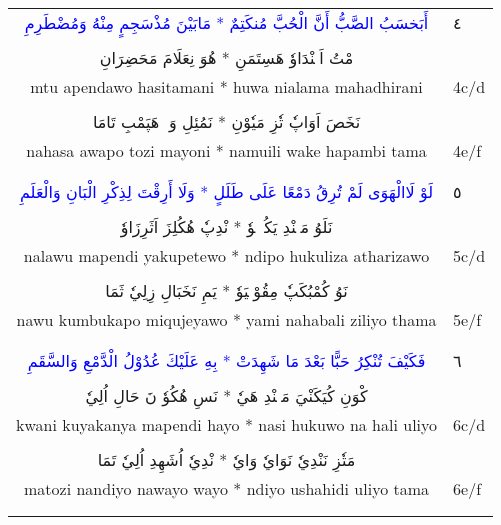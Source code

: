 \documentclass[a4paper, 10pt]{report}
\begin{document}
\begin{longtable}{cl}
\textcolor{blue}{\textarabic{أَبَخسَبُ الصَّبُّ أَنَّ الْحُبَّ مُنكَتِمٌ * مَابَيْنَ مُذْسَجِمٍ مِنْهُ وَمُضْطَرِمِ}} & \textarabic{٤} \\* 
\E{ } & \\[2mm] 
\textcolor{mygreen}{\textarabic{مْتُ اَپٖنْدَاوٗ هَسِتَمَنِ * هُوَ نِعَلَامَ مَحَضِرَانِ}} &  \\* 
mtu apendawo hasitamani * huwa nialama mahadhirani & 4c/d \\* 
\E{ } & \\[2mm] 
\textcolor{mygreen}{\textarabic{نَخَصَ اَوَاپٗ تٗزِ مَيٗوْنِ * نَمُئِلِ وَكٖ هَپَمْبِ تَامَا}} &  \\* 
nahasa awapo tozi mayoni * namuili wake hapambi tama & 4e/f \\* 
\E{ } & \\[2mm] 
\\[6mm] 

\textcolor{blue}{\textarabic{لَوْ لَاالْهَوَى لَمْ تُرِقُ دَمْعًا عَلَى طَلَلٍ * وَلَا أَرِقْتَ لِذِكْرِ الْبَانِ وَالْعَلَمِ}} & \textarabic{٥} \\* 
\E{ } & \\[2mm] 
\textcolor{mygreen}{\textarabic{نَلَوُ مَپٖنْدِ يَكُپٖتٖوٗ * نْدِپٗ هُكُلِزَ اَثَرِزَاوٗ}} &  \\* 
nalawu mapendi yakupetewo * ndipo hukuliza atharizawo & 5c/d \\* 
\E{ } & \\[2mm] 
\textcolor{mygreen}{\textarabic{نَوُ كُمْبُكَپٗ مِقُوْجٖيَوٗ * يَمِ نَخَبَالِ زِلِيٗ ثَمَا}} &  \\* 
nawu kumbukapo miqujeyawo * yami nahabali ziliyo thama & 5e/f \\* 
\E{ } & \\[2mm] 
\\[6mm] 

\textcolor{blue}{\textarabic{فَكَيْفَ تُنْكِرُ حَبًّا بَعْدَ مَا شَهِدَتْ * بِهِ عَلَيْكَ عُدُوْلُ الْدَّمْعِ وَالسَّقَمِ}} & \textarabic{٦} \\* 
\E{ } & \\[2mm] 
\textcolor{mygreen}{\textarabic{كْوَنِ كُيَكَنْيَ مَپٖنْدِ هَيٗ * نَسِ هُكُوٗ نَ حَالِ اُلِيٗ}} &  \\* 
kwani kuyakanya mapendi hayo * nasi hukuwo na hali uliyo & 6c/d \\* 
\E{ } & \\[2mm] 
\textcolor{mygreen}{\textarabic{مَتٗزِ نَنْدِيٗ نَوَايٗ وَايٗ * نْدِيٗ اُشَهِدِ اُلِيٗ تَمَا}} &  \\* 
matozi nandiyo nawayo wayo * ndiyo ushahidi uliyo tama & 6e/f \\* 
\E{ } & \\[2mm] 
\\[6mm] 


\end{longtable}
\end{document}
